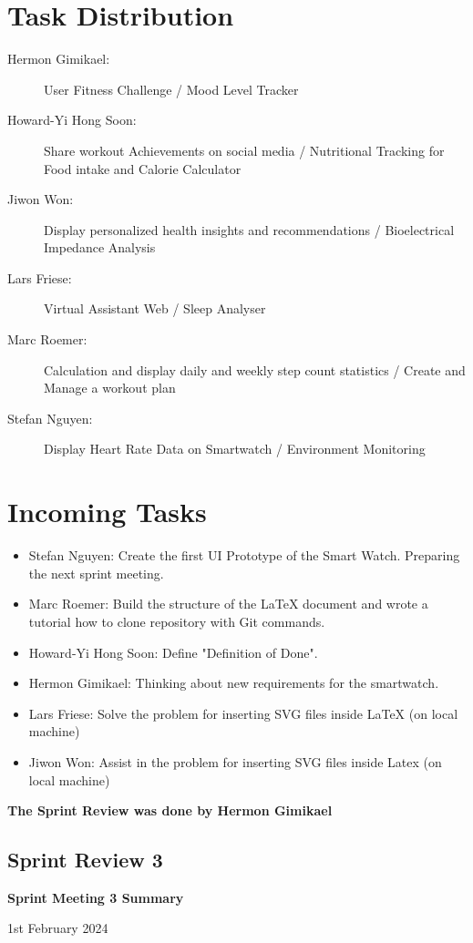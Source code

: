 \documentclass{article}
\begin{document}
\section*{Task Distribution}
\begin{description}
    \item[Hermon Gimikael:] User Fitness Challenge / Mood Level Tracker
    \item[Howard-Yi Hong Soon:] Share workout Achievements on social media / Nutritional Tracking for Food intake and Calorie Calculator
    \item[Jiwon Won:] Display personalized health insights and recommendations / Bioelectrical Impedance Analysis
    \item[Lars Friese:] Virtual Assistant Web / Sleep Analyser
    \item[Marc Roemer:] Calculation and display daily and weekly step count statistics / Create and Manage a workout plan
    \item[Stefan Nguyen:] Display Heart Rate Data on Smartwatch / Environment Monitoring
\end{description}

\section*{Incoming Tasks}
\begin{itemize}
	\item Stefan Nguyen: Create the first UI Prototype of the Smart Watch. Preparing the next sprint meeting.
    \item Marc Roemer: Build the structure of the LaTeX document and wrote a tutorial how to clone repository with Git commands.
    \item Howard-Yi Hong Soon: Define "Definition of Done".
    \item Hermon Gimikael: Thinking about new requirements for the smartwatch.
    \item Lars Friese: Solve the problem for inserting SVG files inside LaTeX (on local machine)
    \item Jiwon Won: Assist in the problem for inserting SVG files inside Latex (on local machine)
\end{itemize}
\noindent
\textbf{The Sprint Review was done by Hermon Gimikael}
\newpage

\subsection{Sprint Review 3}
\begin{center}
    {\Large \textbf{Sprint Meeting 3 Summary}}
    
    \vspace{0.5cm}
    
    {\large 1st February 2024}
\end{center}
\end{document}
